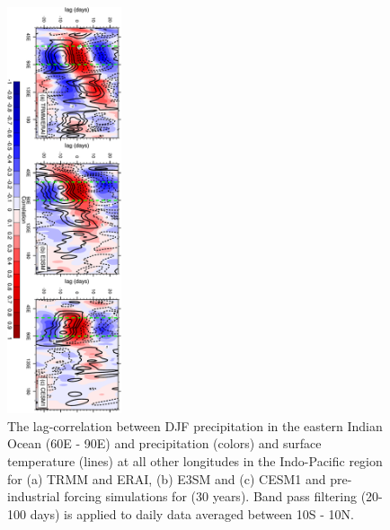 \documentclass[draft,ms]{AGUTeX}
\begin{document}
\begin{article}
\begin{figure}[t]
  \begin{center}
   \noindent\includegraphics[width=0.3\textwidth,angle=90.]{./figs/f_lagcorr_ts_djf.pdf}
  \end{center}
  \caption{The lag-correlation between DJF precipitation in the eastern Indian Ocean (60\deg E - 90\deg E) and precipitation (colors) and surface temperature (lines) at all other longitudes in the Indo-Pacific region for (a) TRMM and ERAI, (b) E3SM and (c) CESM1 and pre-industrial forcing simulations for (30 years). Band pass filtering (20-100 days) is applied to daily data averaged between 10\deg S - 10\deg N.} 
\label{f_lagcorr_ts_djf}
\end{figure}


\end{article}
\end{document}
